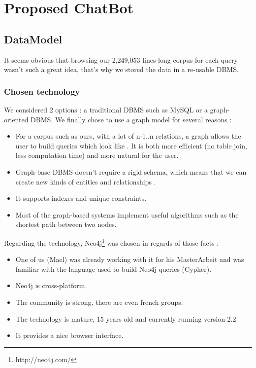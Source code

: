\section{Proposed ChatBot}
%
\subsection{DataModel}
It seems obvious that browsing our 2,249,053 lines-long corpus for each query wasn't such a great idea, that's why we stored the data in a re-usable DBMS.
\subsubsection{Chosen technology}
We considered 2 options : a traditional DBMS such as MySQL or a graph-oriented DBMS. We finally chose to use a graph model for several reasons :
\begin{itemize}
\item For a corpus such as ours, with a lot of n-1..n relations, a graph allows the user to build queries which look like . It is both more efficient (no table join, less computation time) and more natural for the user.
\item Graph-base DBMS doesn't require a rigid schema, which means that we can create new kinds of entities and relationships .
\item It supports indexes and unique constraints.
\item Most of the graph-based systems implement useful algorithms such as the shortest path between two nodes.
\end{itemize}
Regarding the technology, Neo4j\footnote{http://neo4j.com/} was chosen in regards of those facts :
\begin{itemize}
\item One of us (Mael) was already working with it for his MasterArbeit and was familiar with the language used to build Neo4j queries (Cypher).
\item Neo4j is cross-platform.
\item The community is strong, there are even french groups.
\item The technology is mature, 15 years old and currently running version 2.2
\item It provides a nice browser interface.
\end{itemize}

